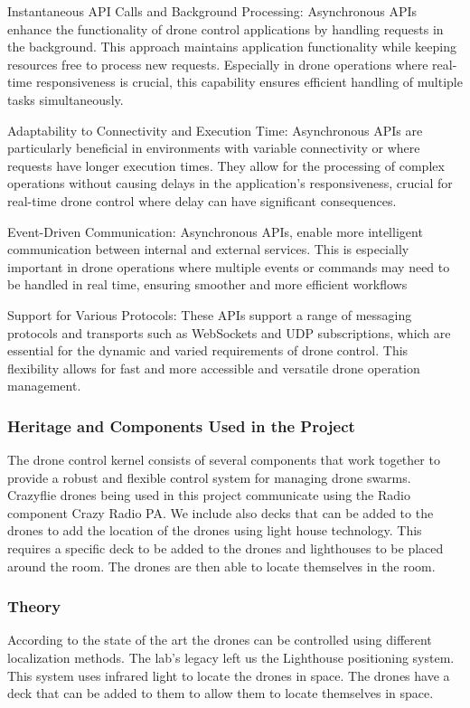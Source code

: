 Instantaneous \gls{API} Calls and Background Processing: Asynchronous \gls{API}s enhance the functionality of drone control applications by handling requests in the background. This approach maintains application functionality while keeping resources free to process new requests. Especially in drone operations where real-time responsiveness is crucial, this capability ensures efficient handling of multiple tasks simultaneously.

Adaptability to Connectivity and Execution Time: Asynchronous \gls{API}s are particularly beneficial in environments with variable connectivity or where requests have longer execution times. They allow for the processing of complex operations without causing delays in the application's responsiveness, crucial for real-time drone control where delay can have significant consequences.

Event-Driven Communication: Asynchronous \gls{API}s, enable more intelligent communication between internal and external services. This is especially important in drone operations where multiple events or commands may need to be handled in real time, ensuring smoother and more efficient workflows

Support for Various Protocols: These \gls{API}s support a range of messaging protocols and transports such as WebSockets and UDP subscriptions, which are essential for the dynamic and varied requirements of drone control. This flexibility allows for fast and more accessible and versatile drone operation management.
\subsubsection{Heritage and Components Used in the Project}
The drone control kernel consists of several components that work together to provide a robust and flexible control system for managing drone swarms. Crazyflie drones being used in this project communicate using the Radio component Crazy Radio PA. We include also decks that can be added to the drones to add the location of the drones using light house technology. This requires a specific deck to be added to the drones and lighthouses to be placed around the room. The drones are then able to locate themselves in the room.
\cite{carstens_intelligent_nodate}

\subsubsection{Theory}
According to the state of the art the drones can be controlled using different localization methods. The lab's legacy left us the Lighthouse positioning system. This system uses infrared light to locate the drones in space. The drones have a deck that can be added to them to allow them to locate themselves in space.

